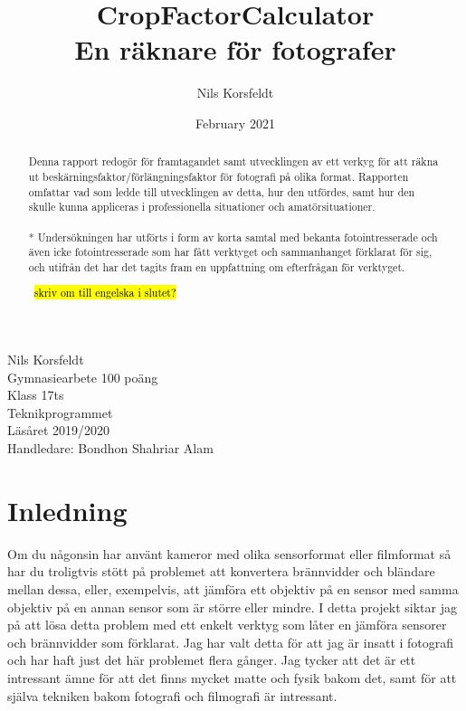 \documentclass[11pt]{article}
\title{%
        CropFactorCalculator\\
        \large En räknare för fotografer}
\author{Nils Korsfeldt}
\date{February 2021}
\begin{document}
\maketitle

{\raggedleft\vfill{%
    Nils Korsfeldt \\ 
    Gymnasiearbete 100 poäng \\
    Klass 17ts \\
    Teknikprogrammet \\
    Läsåret 2019/2020 \\
    Handledare: Bondhon Shahriar Alam
}\par
}
\clearpage

\begin{abstract}
\normalsize
Denna rapport redogör för framtagandet samt utvecklingen av ett verkyg för att räkna ut beskärningsfaktor/förlängningsfaktor för fotografi på olika format. Rapporten omfattar vad som ledde till utvecklingen av detta, hur den utfördes, samt hur den skulle kunna appliceras i professionella situationer och amatörsituationer.\\ \\*
Undersökningen har utförts i form av korta samtal med bekanta fotointresserade och även icke fotointresserade som har fått verktyget och sammanhanget förklarat för sig, och utifrån det har det tagits fram en uppfattning om efterfrågan för verktyget. \par
\bigskip
\textuparrow \ \hl{skriv om till engelska i slutet?}

\end{abstract}

\clearpage

\renewcommand{\contentsname}{Innehållsförteckning}
\tableofcontents

\clearpage

\section{Inledning}
Om du någonsin har använt kameror med olika sensorformat eller filmformat så har du troligtvis stött på problemet att konvertera brännvidder och bländare mellan dessa, eller, exempelvis, att jämföra ett objektiv på en sensor med samma objektiv på en annan sensor som är större eller mindre. I detta projekt siktar jag på att lösa detta problem med ett enkelt verktyg som låter en jämföra sensorer och brännvidder som förklarat. Jag har valt detta för att jag är insatt i fotografi och har haft just det här problemet flera gånger. Jag tycker att det är ett intressant ämne för att det finns mycket matte och fysik bakom det, samt för att själva tekniken bakom fotografi och filmografi är intressant. \par
\end{document}
